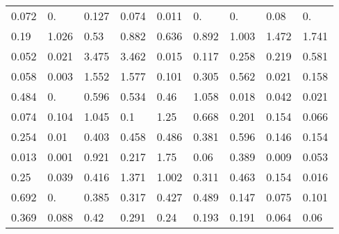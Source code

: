 \begin{tabular}{|lllllllll|}
\color[HTML]{808080}0.072 & \color[HTML]{909090}0. & \color[HTML]{606060}0.127 & \color[HTML]{808080}0.074 & \color[HTML]{909090}0.011 & \color[HTML]{909090}0. & \color[HTML]{909090}0. & \color[HTML]{707070}0.08 & \color[HTML]{909090}0. \\ 
\color[HTML]{505050}0.19 & \color[HTML]{000000}1.026 & \color[HTML]{000000}0.53 & \color[HTML]{000000}0.882 & \color[HTML]{000000}0.636 & \color[HTML]{000000}0.892 & \color[HTML]{000000}1.003 & \color[HTML]{000000}1.472 & \color[HTML]{000000}1.741 \\ 
\color[HTML]{808080}0.052 & \color[HTML]{909090}0.021 & \color[HTML]{000000}3.475 & \color[HTML]{000000}3.462 & \color[HTML]{909090}0.015 & \color[HTML]{707070}0.117 & \color[HTML]{404040}0.258 & \color[HTML]{505050}0.219 & \color[HTML]{000000}0.581 \\ 
\color[HTML]{808080}0.058 & \color[HTML]{909090}0.003 & \color[HTML]{000000}1.552 & \color[HTML]{000000}1.577 & \color[HTML]{707070}0.101 & \color[HTML]{303030}0.305 & \color[HTML]{000000}0.562 & \color[HTML]{909090}0.021 & \color[HTML]{606060}0.158 \\ 
\color[HTML]{000000}0.484 & \color[HTML]{909090}0. & \color[HTML]{000000}0.596 & \color[HTML]{000000}0.534 & \color[HTML]{000000}0.46 & \color[HTML]{000000}1.058 & \color[HTML]{909090}0.018 & \color[HTML]{808080}0.042 & \color[HTML]{909090}0.021 \\ 
\color[HTML]{808080}0.074 & \color[HTML]{707070}0.104 & \color[HTML]{000000}1.045 & \color[HTML]{707070}0.1 & \color[HTML]{000000}1.25 & \color[HTML]{000000}0.668 & \color[HTML]{505050}0.201 & \color[HTML]{606060}0.154 & \color[HTML]{808080}0.066 \\ 
\color[HTML]{404040}0.254 & \color[HTML]{909090}0.01 & \color[HTML]{101010}0.403 & \color[HTML]{000000}0.458 & \color[HTML]{000000}0.486 & \color[HTML]{101010}0.381 & \color[HTML]{000000}0.596 & \color[HTML]{606060}0.146 & \color[HTML]{606060}0.154 \\ 
\color[HTML]{909090}0.013 & \color[HTML]{909090}0.001 & \color[HTML]{000000}0.921 & \color[HTML]{505050}0.217 & \color[HTML]{000000}1.75 & \color[HTML]{808080}0.06 & \color[HTML]{101010}0.389 & \color[HTML]{909090}0.009 & \color[HTML]{808080}0.053 \\ 
\color[HTML]{404040}0.25 & \color[HTML]{808080}0.039 & \color[HTML]{101010}0.416 & \color[HTML]{000000}1.371 & \color[HTML]{000000}1.002 & \color[HTML]{303030}0.311 & \color[HTML]{000000}0.463 & \color[HTML]{606060}0.154 & \color[HTML]{909090}0.016 \\ 
\color[HTML]{000000}0.692 & \color[HTML]{909090}0. & \color[HTML]{101010}0.385 & \color[HTML]{303030}0.317 & \color[HTML]{000000}0.427 & \color[HTML]{000000}0.489 & \color[HTML]{606060}0.147 & \color[HTML]{707070}0.075 & \color[HTML]{707070}0.101 \\ 
\color[HTML]{202020}0.369 & \color[HTML]{707070}0.088 & \color[HTML]{101010}0.42 & \color[HTML]{303030}0.291 & \color[HTML]{404040}0.24 & \color[HTML]{505050}0.193 & \color[HTML]{505050}0.191 & \color[HTML]{808080}0.064 & \color[HTML]{808080}0.06
\end{tabular}
